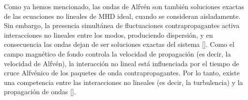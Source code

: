 

Como ya hemos mencionado, las ondas de Alfv\'en son también soluciones
exactas de las ecuaciones no lineales de MHD ideal, cuando se
consideran aisladamente. Sin embargo, la presencia simultánea de
fluctuaciones contrapropagantes activa interacciones no lineales entre
los modos, produciendo dispersión, y en consecuencia las ondas dejan
de ser soluciones exactas del sistema
[\cite{dobrowolny_fully_1980}]. Como el campo magnético de fondo
controla la velocidad de propagación (es decir, la velocidad de
Alfvén), la interacción no lineal está influenciada por el tiempo de
cruce Alfv\'enico de los paquetes de onda contrapropagantes. Por lo
tanto, existe una competencia entre las interacciones no lineales (es
decir, la turbulencia) y la propagación de ondas
[\cite{dmitruk_waves_2009}].

